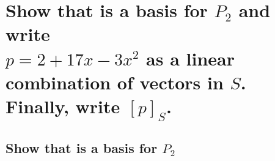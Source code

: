 \documentclass[../main.tex]{subfiles}
\begin{document}

\section{Show that  is a basis for $P_2$ and write \\ 
$p = 2 + 17x - 3x^2$ as a linear combination of vectors in $S$. Finally, write $[p]_S$.}
\subsection{Show that  is a basis for $P_2$}
\end{document}
